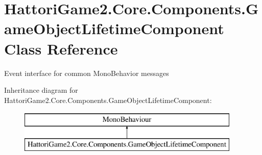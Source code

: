 \hypertarget{class_hattori_game2_1_1_core_1_1_components_1_1_game_object_lifetime_component}{}\section{Hattori\+Game2.\+Core.\+Components.\+Game\+Object\+Lifetime\+Component Class Reference}
\label{class_hattori_game2_1_1_core_1_1_components_1_1_game_object_lifetime_component}


Event interface for common Mono\+Behavior messages  


Inheritance diagram for Hattori\+Game2.\+Core.\+Components.\+Game\+Object\+Lifetime\+Component\+:\begin{figure}[H]
\begin{center}
\leavevmode
\includegraphics[height=2.000000cm]{class_hattori_game2_1_1_core_1_1_components_1_1_game_object_lifetime_component}
\end{center}
\end{figure}
